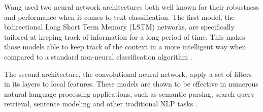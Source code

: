 Wang used two neural network architectures both well known for their robustness and performance when it comes to text classification. 
The first model, the bidirectional Long Short Term Memory (LSTM) networks, are specifically tailored at keeping track of information for a long period of time. 
This makes those models able to keep track of the context in a more intelligent way when compared to a standard non-neural classification algorithm \cite{olah2015}. 

The second architecture, the convolutional neural network, apply a set of filters in its layers to local features. 
These models are shown to be effective in numerous natural language processing applications, such as semantic parsing, search query retrieval, sentence modeling and other traditional NLP tasks \cite{kim2014}.  